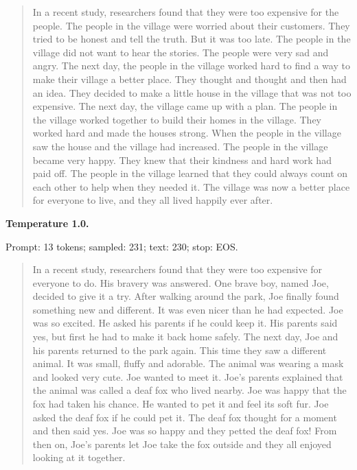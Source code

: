 \begin{quote}\small

In a recent study, researchers found that they were too expensive for the people.
The people in the village were worried about their customers. They tried to be honest and tell the truth. But it was too late. The people in the village did not want to hear the stories. The people were very sad and angry.
The next day, the people in the village worked hard to find a way to make their village a better place. They thought and thought and then had an idea. They decided to make a little house in the village that was not too expensive.
The next day, the village came up with a plan. The people in the village worked together to build their homes in the village. They worked hard and made the houses strong. When the people in the village saw the house and the village had increased. The people in the village became very happy. They knew that their kindness and hard work had paid off.
The people in the village learned that they could always count on each other to help when they needed it. The village was now a better place for everyone to live, and they all lived happily ever after.

\end{quote}


\textbf{Temperature 1.0.}

{\footnotesize Prompt: 13 tokens; sampled: 231; text: 230; stop: EOS.}

\begin{quote}\small

In a recent study, researchers found that they were too expensive for everyone to do. His bravery was answered. One brave boy, named Joe, decided to give it a try.
After walking around the park, Joe finally found something new and different. It was even nicer than he had expected. Joe was so excited. He asked his parents if he could keep it. His parents said yes, but first he had to make it back home safely.
The next day, Joe and his parents returned to the park again. This time they saw a different animal. It was small, fluffy and adorable. The animal was wearing a mask and looked very cute. Joe wanted to meet it.
Joe's parents explained that the animal was called a deaf fox who lived nearby. Joe was happy that the fox had taken his chance. He wanted to pet it and feel its soft fur. Joe asked the deaf fox if he could pet it.
The deaf fox thought for a moment and then said yes. Joe was so happy and they petted the deaf fox! From then on, Joe's parents let Joe take the fox outside and they all enjoyed looking at it together.

\end{quote}

